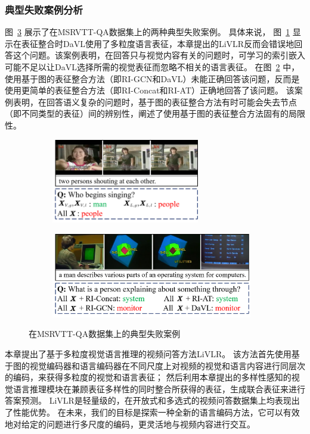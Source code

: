 \subsubsection{典型失败案例分析}
图~\ref{fig:c2_vis_error} 展示了在MSRVTT-QA数据集上的两种典型失败案例。
具体来说，
图~\ref{fig:c2_vis_error_1} 显示在表征整合时DaVL使用了多粒度语言表征，本章提出的LiVLR反而会错误地回答这个问题。该案例表明，在回答只与视觉内容有关的问题时，可学习的索引嵌入可能不足以让DaVL选择所需的视觉表征而忽略不相关的语言表征。
在图~\ref{fig:c2_vis_error_2} 中，使用基于图的表征整合方法（即RI-GCN和DaVL）未能正确回答该问题，反而是使用更简单的表征整合方法（即RI-Concat和RI-AT）正确地回答了该问题。
该案例表明，在回答语义复杂的问题时，基于图的表征整合方法有时可能会失去节点（即不同类型的表征）间的辨别性，阐述了使用基于图的表征整合方法固有的局限性。


\begin{figure}[!t]
\begin{subfigure}[b]{0.42\textwidth}
\centering
\includegraphics[height=3.7cm]{figure/c2_e1.png}
\label{fig:c2_vis_error_1}
\end{subfigure}
\begin{subfigure}[b]{0.56\textwidth}
\centering
\includegraphics[height=3.7cm]{figure/c2_e2.png}
\label{fig:c2_vis_error_2}
\end{subfigure}
\caption{在MSRVTT-QA数据集上的典型失败案例}
\label{fig:c2_vis_error}
\end{figure}


本章提出了基于多粒度视觉语言推理的视频问答方法LiVLR。
该方法首先使用基于图的视觉编码器和语言编码器在不同尺度上对视频的视觉和语言内容进行同层次的编码，来获得多粒度的视觉和语言表征；
然后利用本章提出的多样性感知的视觉语言推理模块在兼顾表征多样性的同时整合所获得的表征，生成联合表征来进行答案预测。
LiVLR是轻量级的，在开放式和多选式的视频问答数据集上均表现出了性能优势。
在未来，我们的目标是探索一种全新的语言编码方法，它可以有效地对给定的问题进行多尺度的编码，更灵活地与视频内容进行交互。



\clearpage
